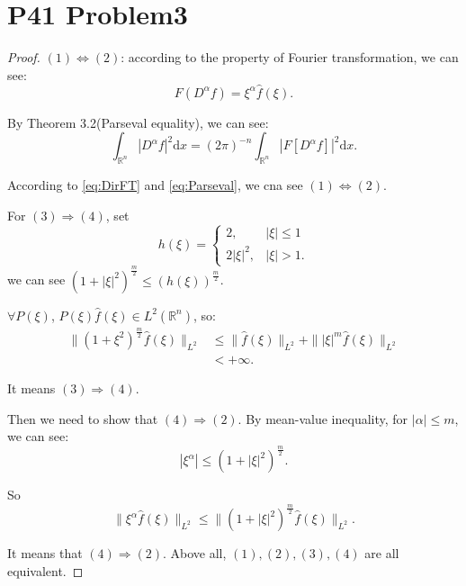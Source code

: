 \documentclass[a4paper]{ctexart}
\newcommand{\dif}{\mathrm{d}}
\begin{document}
\section*{P41 Problem3}
\begin{proof}
    $(1)\Leftrightarrow(2)$: according to the property of Fourier transformation, we can see:
    \begin{equation}
        \label{eq:DirFT}
        F(D^{\alpha}f)=\xi^{\alpha}\hat{f}(\xi).
    \end{equation}

    By Theorem 3.2(Parseval equality), we can see:
    \begin{equation}
        \label{eq:Parseval}
        \int_{\mathbb{R}^{n}}|D^{\alpha}f|^{2}\dif x=(2\pi)^{-n}\int_{\mathbb{R}^{n}}|F[D^{\alpha}f]|^{2}\dif x.
    \end{equation}

    According to \eqref{eq:DirFT} and \eqref{eq:Parseval}, we cna see $(1)\Leftrightarrow(2)$.

    For $(3)\Rightarrow(4)$, set 
    \begin{equation}
        h(\xi)=\left\{
            \begin{aligned}
                2,&|\xi|\le1\\
                2|\xi|^{2},&|\xi|>1.
            \end{aligned}
        \right.
    \end{equation}
    we can see $(1+|\xi|^{2})^{\frac{m}{2}}\le(h(\xi))^{\frac{m}{2}}$.

    $\forall P(\xi)$, $P(\xi)\hat{f}(\xi)\in L^{2}(\mathbb{R}^{n})$, so:
    \begin{equation}
        \begin{aligned}
            \|(1+\xi^{2})^{\frac{m}{2}}\hat{f}(\xi)\|_{L^{2}}&\le\|\hat{f}(\xi)\|_{L^{2}}+\||\xi|^{m}\hat{f}(\xi)\|_{L^{2}}\\
            &<+\infty.
        \end{aligned}
    \end{equation}
    
    It means $(3)\Rightarrow (4)$.

    Then we need to show that $(4)\Rightarrow (2)$. By mean-value inequality, for $|\alpha|\le m$, we can see:
    \begin{equation}
        |\xi^{\alpha}|\le(1+|\xi|^{2})^{\frac{m}{2}}.
    \end{equation}

    So 
    \begin{equation}
        \|\xi^{\alpha}\hat{f}(\xi)\|_{L^{2}}\le\|(1+|\xi|^{2})^{\frac{m}{2}}\hat{f}(\xi)\|_{L^{2}}.
    \end{equation}

    It means that $(4)\Rightarrow(2)$. Above all, $(1),(2),(3),(4)$ are all equivalent.
\end{proof}
\end{document}
